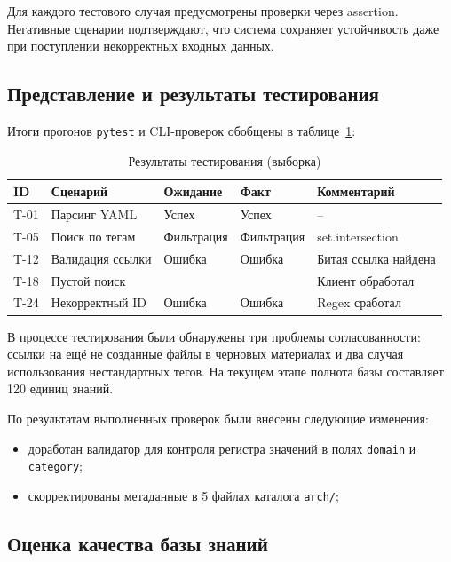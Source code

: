 Для каждого тестового случая предусмотрены проверки через assertion. Негативные сценарии подтверждают, что система сохраняет устойчивость даже при поступлении некорректных входных данных.

\subsection{Представление и результаты тестирования}

Итоги прогонов \texttt{pytest} и CLI-проверок обобщены в таблице~\ref{tab:test_results}:

\begin{table}[h]
\centering
\caption{Результаты тестирования (выборка)}
\label{tab:test_results}
\begin{tabularx}{\textwidth}{|l|>{\raggedright\arraybackslash}p{}|>{\raggedright\arraybackslash}p{}|>{\raggedright\arraybackslash}p{}|>{\raggedright\arraybackslash}X|}
\hline
\textbf{ID} & \textbf{Сценарий} & \textbf{Ожидание} & \textbf{Факт} & \textbf{Комментарий} \\ \hline
T-01 & Парсинг YAML & Успех & Успех & -- \\ \hline
T-05 & Поиск по тегам & Фильтрация & Фильтрация & set.intersection \\ \hline
T-12 & Валидация ссылки & Ошибка & Ошибка & Битая ссылка найдена \\ \hline
T-18 & Пустой поиск & [] & [] & Клиент обработал \\ \hline
T-24 & Некорректный ID & Ошибка & Ошибка & Regex сработал \\ \hline
\end{tabularx}
\end{table}

В процессе тестирования были обнаружены три проблемы согласованности: ссылки на ещё не созданные файлы в черновых материалах и два случая использования нестандартных тегов. На текущем этапе полнота базы составляет 120 единиц знаний.

По результатам выполненных проверок были внесены следующие изменения:
\begin{itemize}
    \item доработан валидатор для контроля регистра значений в полях \texttt{domain} и \texttt{category};
    \item скорректированы метаданные в 5 файлах каталога \texttt{arch/};
\end{itemize}

\subsection{Оценка качества базы знаний}

